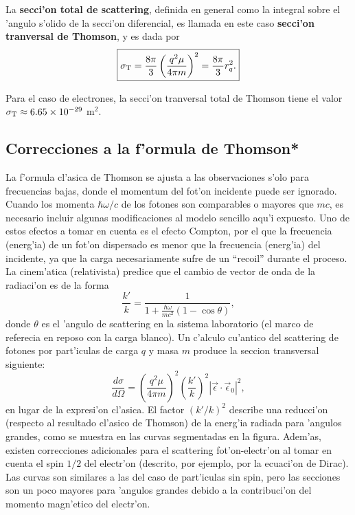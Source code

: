 La \textbf{secci'on total de scattering}, definida en general como la integral sobre el 'angulo s'olido de la secci'on diferencial, es llamada en este caso \textbf{secci'on tranversal de Thomson}, y es dada por
\begin{equation}
\boxed{\sigma_{\rm T}=\frac{8\pi}{3}\left(\frac{q^2\mu}{4\pi m}\right)^2=\frac{8\pi}{3} r_q^2.}
\end{equation}

Para el caso de electrones, la secci'on tranversal total de Thomson tiene el valor $\sigma_{\rm T}\approx 6.65\times 10^{-29}$ m$^2$.

\subsection{Correcciones a la f'ormula de Thomson*}
La f'ormula cl'asica de Thomson se ajusta a las observaciones s'olo para frecuencias bajas, donde el momentum del fot'on incidente puede ser ignorado. Cuando los momenta $\hbar\omega/c$ de los fotones son comparables o mayores que $mc$, es necesario incluir algunas modificaciones al modelo sencillo aqu'i expuesto. Uno de estos efectos a tomar en cuenta es el efecto Compton, por el que la frecuencia (energ'ia) de un fot'on dispersado es menor que la frecuencia (energ'ia) del incidente, ya que la carga necesariamente sufre de un ``recoil'' durante el proceso. La cinem'atica (relativista) predice que el cambio de vector de onda de la radiaci'on es de la forma
\begin{equation}
\frac{k'}{k}=\frac{1}{1+\frac{\hbar\omega}{mc^2}\left(  1-\cos
\theta\right)  }, \label{Thomson}
\end{equation}
donde $\theta$ es el 'angulo de scattering en la sistema laboratorio (el marco
de referecia en reposo con la carga blanco). Un c'alculo cu'antico del
scattering de fotones por part'iculas de carga $q$ y masa $m$ produce la seccion
transversal siguiente:
\begin{equation}
\frac{d\sigma}{d\Omega}=\left(\frac{q^2\mu}{4\pi m}\right)^2  \left(
\frac{k'}{k}\right)^2\left|  \vec{\epsilon}\cdot\vec{\epsilon}_0\right|
^2 , \label{Thomson-corr}
\end{equation}
en lugar de la expresi'on cl'asica. El factor $(k'/k)^2$ describe una
reducci'on  (respecto al resultado cl'asico de Thomson) de la energ'ia radiada
para 'angulos grandes, como se muestra en las curvas segmentadas en la figura.
Adem'as, existen correcciones adicionales para el scattering fot'on-electr'on al
tomar en cuenta el spin ${1}/{2}$ del electr'on (descrito, por ejemplo, por
la ecuaci'on de Dirac). Las curvas son similares a las del caso de part'iculas
sin spin, pero las secciones son un poco mayores para 'angulos grandes debido a
la contribuci'on del momento magn'etico del electr'on.


